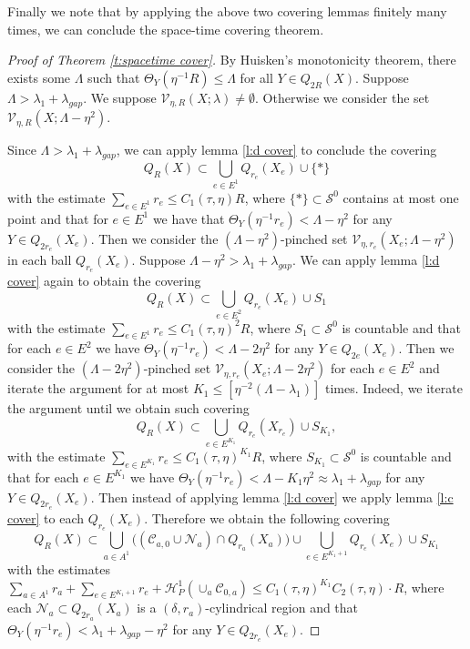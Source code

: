 \documentclass[11pt,reqno]{amsart}
\numberwithin{equation}{section}
\newcommand{\cC}{\mathcal{C}}
\newcommand{\cH}{\mathcal{H}}
\newcommand{\cN}{\mathcal{N}}
\newcommand{\cS}{\mathcal{S}}
\newcommand{\cV}{\mathcal{V}}
\theoremstyle{definition}
\theoremstyle{remark}
\theoremstyle{remark}
\theoremstyle{remark}
\theoremstyle{remark}\newtheorem{conjecture}[equation]{Conjecture}
\theoremstyle{remark}\newtheorem{question}[equation]{Question}
\begin{document}
Finally we note that by applying the above two covering lemmas finitely many times, we can conclude the space-time covering theorem.

\begin{proof}[Proof of Theorem \ref{t:spacetime cover}]
    By Huisken's monotonicity theorem, there exists some $\Lambda$ such that $\Theta_Y(\eta^{-1}R) \le \Lambda$ for all $Y \in Q_{2R}(X)$. Suppose $\Lambda > \lambda_1 + \lambda_{gap}$. We suppose $\cV_{\eta,R}(X;\lambda) \neq \emptyset$. Otherwise we consider the set $\cV_{\eta,R}(X;\Lambda-\eta^2)$.  

    Since $\Lambda > \lambda_1 + \lambda_{gap}$, we can apply lemma \ref{l:d cover} to conclude the covering
    \begin{equation*}
        Q_R(X) \subset \bigcup_{e\in E^1} Q_{r_e}(X_e) \cup \{*\}
    \end{equation*}
    with the estimate $\sum_{e\in E^1} r_e \le C_1(\tau,\eta)R$, where $\{*\} \subset \cS^0$ contains at most one point and that for $e\in E^1$ we have that $\Theta_Y(\eta^{-1} r_e) < \Lambda-\eta^2$ for any $Y \in Q_{2r_e}(X_e)$. Then we consider the $(\Lambda-\eta^2)$-pinched set $\cV_{\eta,r_e}(X_e;\Lambda-\eta^2)$ in each ball $Q_{r_e}(X_e)$. Suppose $\Lambda-\eta^2 > \lambda_1 + \lambda_{gap}$. We can apply lemma \ref{l:d cover} again to obtain the covering
    \begin{equation*}
        Q_R(X) \subset \bigcup_{e \in E^2} Q_{r_e}(X_e) \cup S_1
    \end{equation*}
    with the estimate $\sum_{e\in E^1} r_e \le C_1(\tau,\eta)^2 R$, where $S_1 \subset \cS^0$ is countable and that for each $e\in E^2$ we have $\Theta_Y(\eta^{-1}r_e) < \Lambda-2\eta^2$ for any $Y\in Q_{2e}(X_e)$. Then we consider the $(\Lambda-2\eta^2)$-pinched set $\cV_{\eta,r_e}(X_e;\Lambda-2\eta^2)$ for each $e\in E^2$ and iterate the argument for at most $K_1 \le [\eta^{-2}(\Lambda - \lambda_1)]$ times. Indeed, we iterate the argument until we obtain such covering
    \begin{equation*}
        Q_R(X) \subset \bigcup_{e\in E^{K_1}} Q_{r_e}(X_{r_e}) \cup S_{K_1},
    \end{equation*}
    with the estimate $\sum_{e\in E^{K_1}} r_e \le C_1(\tau,\eta)^{K_1} R$, where $S_{K_1} \subset \cS^0$ is countable and that for each $e \in E^{K_1}$ we have $\Theta_Y(\eta^{-1}r_e) < \Lambda - {K_1}\eta^{2} \approx \lambda_1 + \lambda_{gap}$ for any $Y\in Q_{2r_e}(X_e)$. Then instead of applying lemma \ref{l:d cover} we apply lemma \ref{l:c cover} to each $Q_{r_e}(X_e)$. Therefore we obtain the following covering
    \begin{equation*}
        Q_R(X) \subset \bigcup_{a\in A^1} \big( (\cC_{a,0} \cup \cN_a) \cap Q_{r_a}(X_a) \big) \cup \bigcup_{e \in E^{K_1+1}} Q_{r_e}(X_e) \cup S_{K_1}
    \end{equation*}
with the estimates $\sum_{a \in A^1} r_a +\sum_{e\in E^{K_1+1} } r_e + \cH^1_P(\cup_a \cC_{0,a}) \le C_1(\tau,\eta)^{K_1} C_2(\tau,\eta) \cdot R$, where each $\cN_a \subset Q_{2r_a}(X_a)$ is a $(\delta,r_a)$-cylindrical region and that $\Theta_Y(\eta^{-1}r_e) < \lambda_1 +\lambda_{gap}- \eta^{2} $ for any $Y \in Q_{2r_e}(X_e)$. 


\end{proof}
\end{document}
